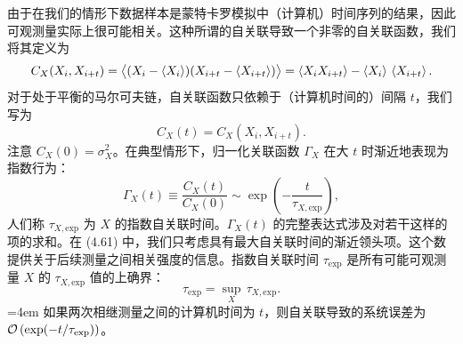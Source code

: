由于在我们的情形下数据样本是蒙特卡罗模拟中（计算机）时间序列的结果，因此可观测量实际上很可能相关。这种所谓的自关联导致一个非零的自关联函数，我们将其定义为
\begin{equation}
  C_X(X_i, X_{i+t}) = \big\langle (X_i - \left\langle X_i \right\rangle)(X_{i+t} - \left\langle X_{i+t} \right\rangle)\big\rangle
  = \left\langle X_i X_{i+t} \right\rangle - \left\langle X_i \right\rangle\,\left\langle X_{i+t} \right\rangle .
\end{equation}
对于处于平衡的马尔可夫链，自关联函数只依赖于（计算机时间的）间隔 $t$，我们写为
\begin{equation}
  C_X(t) = C_X(X_i, X_{i+t}) .
\end{equation}
注意 $C_X(0) = \sigma_X^2$。在典型情形下，归一化关联函数 $\Gamma_X$ 在大 $t$ 时渐近地表现为指数行为：
\begin{equation}
  \Gamma_X(t) \equiv \frac{C_X(t)}{C_X(0)} \sim \exp\!\left(-\frac{t}{\tau_{X,\mathrm{exp}}}\right),
\end{equation}
人们称 $\tau_{X,\mathrm{exp}}$ 为 $X$ 的指数自关联时间。$\Gamma_X(t)$ 的完整表达式涉及对若干这样的项的求和。在 (4.61) 中，我们只考虑具有最大自关联时间的渐近领头项。这个数提供关于后续测量之间相关强度的信息。指数自关联时间 $\tau_\mathrm{exp}$ 是所有可能可观测量 $X$ 的 $\tau_{X,\mathrm{exp}}$ 值的上确界：
\begin{equation}
  \tau_\mathrm{exp} = \sup_{X}\,\tau_{X,\mathrm{exp}} .
\end{equation}
\begingroup\emergencystretch=4em 如果两次相继测量之间的计算机时间为 $t$，则自关联导致的系统误差为\linebreak[0] $\mathcal{O}\left(\exp(-t/\tau_\mathrm{exp})\right)$。\par\endgroup

